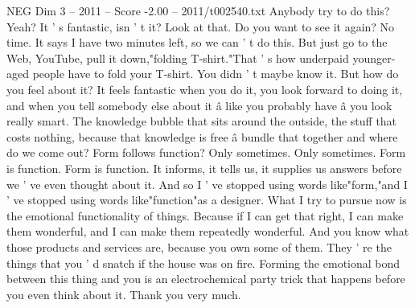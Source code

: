 \begin{textsample}{NEG Dim 3 – 2011 – Score -2.00 – 2011/t002540.txt}
Anybody try to do this?
Yeah?
It ' s fantastic, isn ' t it?
Look at that.
Do you want to see it again?
No time.
It says I have two minutes left, so we can ' t do this.
But just go to the Web, YouTube, pull it down,"folding T-shirt."That ' s how underpaid younger-aged people have to fold your T-shirt.
You didn ' t maybe know it.
But how do you feel about it?
It feels fantastic when you do it, you look forward to doing it, and when you tell somebody else about it â like you probably have â you look really smart.
The knowledge bubble that sits around the outside, the stuff that costs nothing, because that knowledge is free â bundle that together and where do we come out?
Form follows function?
Only sometimes.
Only sometimes.
Form is function.
Form is function.
It informs, it tells us, it supplies us answers before we ' ve even thought about it.
And so I ' ve stopped using words like"form,"and I ' ve stopped using words like"function"as a designer.
What I try to pursue now is the emotional functionality of things.
Because if I can get that right, I can make them wonderful, and I can make them repeatedly wonderful.
And you know what those products and services are, because you own some of them.
They ' re the things that you ' d snatch if the house was on fire.
Forming the emotional bond between this thing and you is an electrochemical party trick that happens before you even think about it.
Thank you very much.

\end{textsample}
